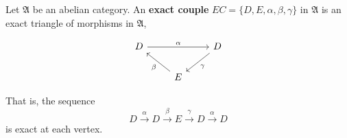 Let $\mathfrak{A}$ be an abelian category. An \textbf{exact couple} $EC = \{D, E, \alpha, \beta, \gamma\}$ in $\mathfrak{A}$ is an exact triangle of morphisms in $\mathfrak{A}$,

$$\begin{tikzcd}
D \arrow[rr, "\alpha"] & & D \arrow[dl, "\gamma"] \\
& E \arrow[ul, "\beta"] &
\end{tikzcd}$$

That is, the sequence
$$D \xrightarrow{\alpha} D \xrightarrow{\beta} E \xrightarrow{\gamma} D \xrightarrow{\alpha} D$$
is exact at each vertex.
